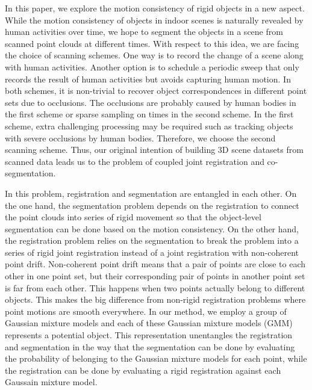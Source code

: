 In this paper, we explore the motion consistency of rigid objects in a new aspect.
While the motion consistency of objects in indoor scenes is naturally revealed by human activities over time, we hope to segment the objects in a scene from scanned point clouds at different times. 
%
With respect to this idea, we are facing the choice of scanning schemes. One way is to record the change of a scene along with human activities. Another option is to schedule a periodic sweep that only records the result of human activities but avoids capturing human motion. 
In both schemes, it is non-trivial to recover object correspondences in different point sets due to occlusions.
The occlusions are probably caused by human bodies in the first scheme or sparse sampling on times in the second scheme. 
%
In the first scheme, extra challenging processing may be required such as tracking objects with severe occlusions by human bodies. Therefore, we choose the second scanning scheme. 
Thus, our original intention of building 3D scene datasets from scanned data leads us to the problem of coupled joint registration and co-segmentation.



In this problem, registration and segmentation are entangled in each other. On the one hand, the segmentation problem depends on the registration to connect the point clouds into series of rigid movement so that the object-level segmentation can be done based on the motion consistency. 
On the other hand, the registration problem relies on the segmentation to break the problem into a series of rigid joint registration instead of a joint registration with non-coherent point drift. 
%
Non-coherent point drift means that a pair of points are close to each other in one point set, but their corresponding pair of points in another point set is far from each other. 
This happens when two points actually belong to different objects.
%
This makes the big difference from non-rigid registration problems where point motions are smooth everywhere.
%
In our method, we employ a group of Gaussian mixture models and each of these Gaussian mixture models (GMM) represents a potential object. 
This representation unentangles the registration and segmentation in the way that the segmentation can be done by evaluating the probability of belonging to the Gaussian mixture models for each point, while the registration can be done by evaluating a rigid registration  against each Gaussain mixture model.


